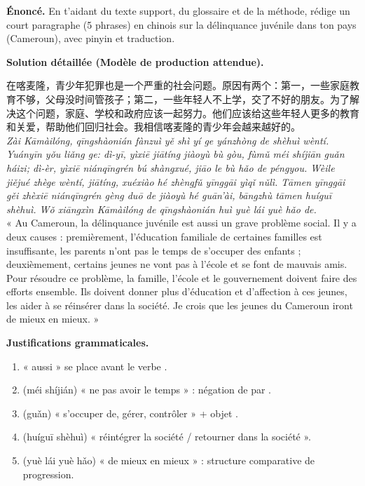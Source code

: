 \documentclass[11pt]{article}
\newcommand{\zh}[1]{\ifmmode\text{#1}\else{#1}\fi}
\begin{document}
\begin{exoresolu}
\textbf{Énoncé.} En t'aidant du texte support, du glossaire et de la méthode, rédige un court paragraphe (5 phrases) en chinois sur la délinquance juvénile dans ton pays (Cameroun), avec pinyin et traduction.

\tcblower
\textbf{Solution détaillée (Modèle de production attendue).}

在喀麦隆，青少年犯罪也是一个严重的社会问题。原因有两个：第一，一些家庭教育不够，父母没时间管孩子；第二，一些年轻人不上学，交了不好的朋友。为了解决这个问题，家庭、学校和政府应该一起努力。他们应该给这些年轻人更多的教育和关爱，帮助他们回归社会。我相信喀麦隆的青少年会越来越好的。\\
\emph{Zài Kāmàilóng, qīngshàonián fànzuì yě shì yí ge yánzhòng de shèhuì wèntí. Yuányīn yǒu liǎng ge: dì-yī, yìxiē jiātíng jiàoyù bù gòu, fùmǔ méi shíjiān guǎn háizi; dì-èr, yìxiē niánqīngrén bú shàngxué, jiāo le bù hǎo de péngyou. Wèile jiějué zhège wèntí, jiātíng, xuéxiào hé zhèngfǔ yīnggāi yìqǐ nǔlì. Tāmen yīnggāi gěi zhèxiē niánqīngrén gèng duō de jiàoyù hé guān'ài, bāngzhù tāmen huíguī shèhuì. Wǒ xiāngxìn Kāmàilóng de qīngshàonián huì yuè lái yuè hǎo de.}\\
« Au Cameroun, la délinquance juvénile est aussi un grave problème social. Il y a deux causes : premièrement, l'éducation familiale de certaines familles est insuffisante, les parents n'ont pas le temps de s'occuper des enfants ; deuxièmement, certains jeunes ne vont pas à l'école et se font de mauvais amis. Pour résoudre ce problème, la famille, l'école et le gouvernement doivent faire des efforts ensemble. Ils doivent donner plus d'éducation et d'affection à ces jeunes, les aider à se réinsérer dans la société. Je crois que les jeunes du Cameroun iront de mieux en mieux. »

\textbf{Justifications grammaticales.}
\begin{enumerate}
\item \zh{也} « aussi » se place avant le verbe \zh{是}.
\item \zh{没时间} (méi shíjián) « ne pas avoir le temps » : négation de \zh{有} par \zh{没}.
\item \zh{管} (guǎn) « s'occuper de, gérer, contrôler » + objet \zh{孩子}.
\item \zh{回归社会} (huíguī shèhuì) « réintégrer la société / retourner dans la société ».
\item \zh{越来越好} (yuè lái yuè hǎo) « de mieux en mieux » : structure comparative de progression.
\end{enumerate}
\end{exoresolu}
\end{document}
